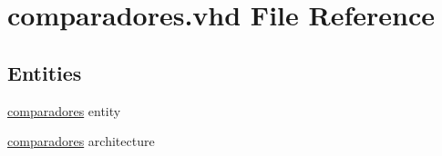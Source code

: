 \hypertarget{comparadores_8vhd}{}\section{comparadores.\+vhd File Reference}
\label{comparadores_8vhd}
\subsection*{Entities}
\begin{DoxyCompactItemize}
\item 
\hyperlink{classcomparadores}{comparadores} entity
\item 
\hyperlink{classcomparadores_1_1comparadores}{comparadores} architecture
\end{DoxyCompactItemize}
